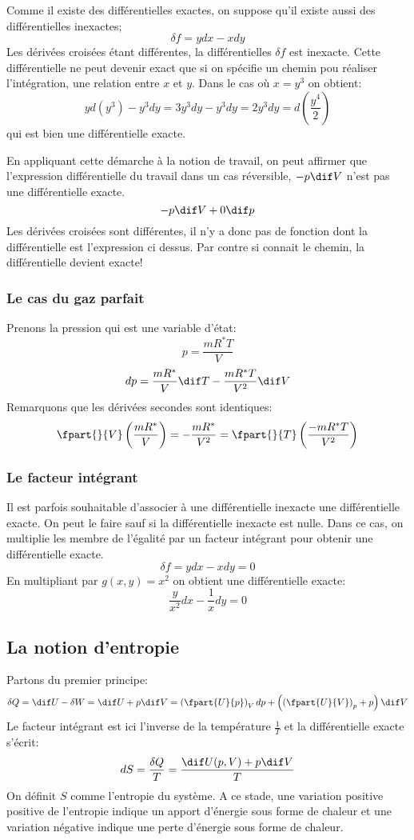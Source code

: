 Comme il existe des différentielles exactes,
on suppose qu'il existe aussi des différentielles inexactes;
\[ \delta f = ydx -xdy \]
Les dérivées croisées étant différentes,
la différentielles $\delta f$ est inexacte.
Cette différentielle ne peut devenir exact que si
on spécifie un chemin pou réaliser l'intégration, une relation entre $x$ et $y$.
Dans le cas où $x = y^3$ on obtient:
\[  yd(y^3)-y^3dy = 3y^3dy-y^3dy = 2y^3dy = d\left(\frac{y^4}{2}\right) \]
qui est bien une différentielle exacte.

En appliquant cette démarche à la notion de travail,
on peut affirmer que l'expression différentielle du travail
dans un cas réversible, $-p\dif V$ n'est pas une différentielle exacte.
\[ -p\dif V+0\dif p \]
Les dérivées croisées sont différentes,
il n'y a donc pas de fonction dont la différentielle est l'expression ci dessus.
Par contre si connait le chemin, la différentielle devient exacte!
\subsubsection{Le cas du gaz parfait}
Prenons la pression qui est une variable d'état:
\[ p = \frac{mR^*T}{V} \]
\[ dp = \frac{mR^*}{V}\dif T-\frac{mR^*T}{V^2}\dif V \]
Remarquons que les dérivées secondes sont identiques:
\[ \fpart{}{V} \left(\frac{mR^*}{V}\right) =
-\frac{mR^*}{V^2} = \fpart{}{T}
\left(\frac{-mR^*T}{V^2}\right) \]

\subsubsection{Le facteur intégrant}
Il est parfois souhaitable d'associer à une différentielle
inexacte une différentielle exacte.
On peut le faire sauf si la différentielle inexacte est nulle.
Dans ce cas, on multiplie les membre de l'égalité par un facteur intégrant
pour obtenir une différentielle exacte.
\[ \delta f = ydx-xdy = 0 \]
En multipliant par $g(x,y) = x^2$ on obtient une différentielle exacte:
\[ \frac y {x^2} dx -\frac 1xdy = 0 \]
\subsection{La notion d'entropie}
Partons du premier principe:
\[ \delta Q = \dif U - \delta W = \dif U +p\dif V =
\left(\fpart{U}{p}\right)_V dp +
\left ( \left ( \fpart{U}{V}\right)_p + p \right)\dif V \]
Le facteur intégrant est ici l'inverse de la température
$\frac{1}{T}$ et la différentielle exacte s'écrit:
\[ dS = \frac{\delta Q}{T} = \frac{\dif U(p,V)+p\dif V }T \]
On définit $S$ comme l'entropie du système.
A ce stade, une variation positive positive de l'entropie
indique un apport d'énergie sous forme de chaleur et
une variation négative indique une perte d'énergie sous forme de chaleur.

